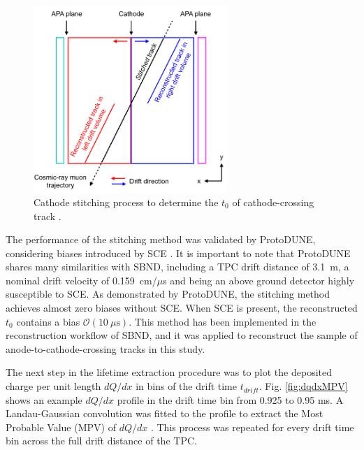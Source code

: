 \begin{figure}[hb!] 
\centering    
\includegraphics[width=0.65\textwidth]{cosmic_stitch}
\caption[Cathode Stitching Diagram]{
Cathode stitching process to determine the $t_{0}$ of cathode-crossing track \cite{pandora_protodune}.
}
\label{fig:cosmic_stitch}
\end{figure}

The performance of the stitching method was validated by ProtoDUNE, considering biases introduced by SCE \cite{pandora_protodune}.
It is important to note that ProtoDUNE shares many similarities with SBND, including a TPC drift distance of 3.1~m, a nominal drift velocity of 0.159~cm/$\mu$s and being an above ground detector highly susceptible to SCE.
As demonstrated by ProtoDUNE, the stitching method achieves almost zero biases without SCE.
When SCE is present, the reconstructed $t_0$ contains a bias $\mathcal{O}(10~\mu\mathrm{s})$.
This method has been implemented in the reconstruction workflow of SBND, and it was applied to reconstruct the sample of anode-to-cathode-crossing tracks in this study.


The next step in the lifetime extraction procedure was to plot the deposited charge per unit length $dQ/dx$ in bins of the drift time $t_{drift}$.
Fig. \ref{fig:dqdxMPV} shows an example $dQ/dx$ profile in the drift time bin from 0.925 to 0.95 ms.
A Landau-Gaussian convolution was fitted to the profile to extract the Most Probable Value (MPV) of $dQ/dx$ \cite{Passage}.
This process was repeated for every drift time bin across the full drift distance of the TPC.


